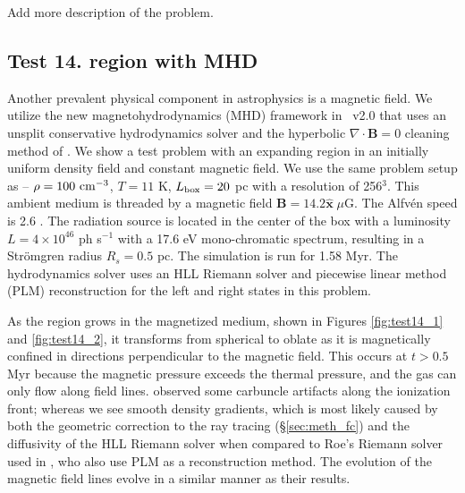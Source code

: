 \documentclass[useAMS,usenatbib]{mn2e}
\begin{document}
\li Add more description of the problem.

\subsection{Test 14. \hii region with MHD}

\begin{figure*}
  \caption{\label{fig:test14_1} Test 14. (\hii region with MHD).
    Left to right: slices of density at $t = 0.18, 0.53, 1.58$ Myr in
    the x-y plane.  The streamlines show the magnetic field.}
\end{figure*}

\begin{figure*}
  \caption{\label{fig:test14_2} Test 14. (\hii region with
    MHD). Slices of density (top) and the x-component of the magnetic
    field (bottom) in the y-z plane at $t = 0.18, 0.53, 1.58$ Myr
    (left to right).}
\end{figure*}

Another prevalent physical component in astrophysics is a magnetic
field.  We utilize the new magnetohydrodynamics (MHD) framework
\citep{Wang09} in \enzo~v2.0 that uses an unsplit conservative
hydrodynamics solver and the hyperbolic $\nabla \cdot \mathbf{B} = 0$
cleaning method of \citet{Dedner02}.  We show a test problem with an
expanding \hii region in an initially uniform density field and
constant magnetic field.  We use the same problem setup as
\citet{Krumholz07_ART} -- $\rho = 100~\cubecm$, $T = 11$ K, $L_{\rm
  box} = 20$ pc with a resolution of 256$^3$.  This ambient medium is
threaded by a magnetic field $\mathbf{B} = 14.2 \hat{\mathbf{x}} \;
\mu\mathrm{G}$.  The Alfv\'{e}n speed is 2.6 \kms.  The radiation
source is located in the center of the box with a luminosity $L = 4
\times 10^{46}$ ph s$^{-1}$ with a 17.6 eV mono-chromatic spectrum,
resulting in a Str\"{o}mgren radius $R_s = 0.5$ pc.  The simulation is
run for 1.58 Myr.  The hydrodynamics solver uses an HLL Riemann solver
\citep{HLL} and piecewise linear method (PLM) reconstruction
\citep{PLM} for the left and right states in this problem.

As the \hii region grows in the magnetized medium, shown in
Figures \ref{fig:test14_1} and \ref{fig:test14_2}, it transforms from
spherical to oblate as it is magnetically confined in directions
perpendicular to the magnetic field.  This occurs at $t > 0.5$ Myr
because the magnetic pressure exceeds the thermal pressure, and the
gas can only flow along field lines.  \citeauthor{Krumholz07_ART}
observed some carbuncle artifacts along the ionization front; whereas
we see smooth density gradients, which is most likely caused by both
the geometric correction to the ray tracing (\S\ref{sec:meth_fc}) and
the diffusivity of the HLL Riemann solver when compared to Roe's
Riemann solver used in \citet{Krumholz07_ART}, who also use PLM as a
reconstruction method.  The evolution of the magnetic field lines
evolve in a similar manner as their results.
\end{document}
